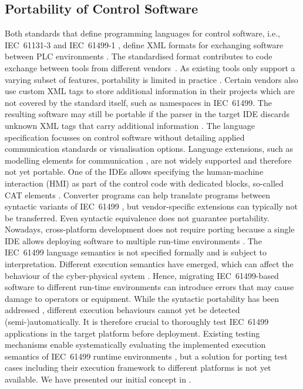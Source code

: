 \subsection{Portability of Control Software}
Both standards that define programming languages for control software, i.e., IEC~61131-3 \cite{61131.3} and IEC~61499-1 \cite{61499}, define XML formats for exchanging software between PLC environments \cite{61131.10,plcopenpaper, 61499.2, Testing_Midhun}. The standardised format contributes to code exchange between tools from different vendors~\cite{plcopenpaper}. As existing tools only support a varying subset of features, portability is limited in practice \cite{Testing_Midhun}. Certain vendors also use custom XML tags to store additional information in their projects which are not covered by the standard itself, such as namespaces in IEC~61499. The resulting software may still be portable if the parser in the target IDE discards unknown XML tags that carry additional information \cite{Hopsu.2019}.  The language specification focusses on control software without detailing applied communication standards or visualisation options. Language extensions, such as modelling elements for communication \cite{Bruns.2023}, are not widely supported and therefore not yet portable. One of the IDEs allows specifying the human-machine interaction (HMI) as part of the control code with dedicated blocks, so-called CAT elements \cite{Hopsu.2019}. Converter programs can help translate programs between syntactic variants of IEC~61499 \cite{Hopsu.2019}, but vendor-specific extensions can typically not be transferred. 
Even syntactic equivalence does not guarantee portability. Nowadays, cross-platform development does not require porting because a single IDE allows deploying software to multiple run-time environments \cite{aimirimi}. 
The IEC~61499 language semantics is not specified formally and is subject to interpretation. Different execution semantics have emerged, which can affect the behaviour of the cyber-physical system \cite{cengic_executionsemantics}. Hence, migrating IEC~61499-based software to different run-time environments can introduce errors that may cause damage to operators or equipment. While the syntactic portability has been addressed \cite{Hopsu.2019,Testing_Midhun}, different execution behaviours cannot yet be detected (semi-)automatically. It is therefore crucial to thoroughly test IEC~61499 applications in the target platform before deployment. Existing testing mechanisms enable systematically evaluating the implemented execution semantics of IEC~61499 runtime environments \cite{Wiesmayr.2023,pfefferkorn,Testing_Midhun}, but a solution for porting test cases including their execution framework to different platforms is not yet available. We have presented our initial concept in \cite{biancaMidhunETFAwip}. 

